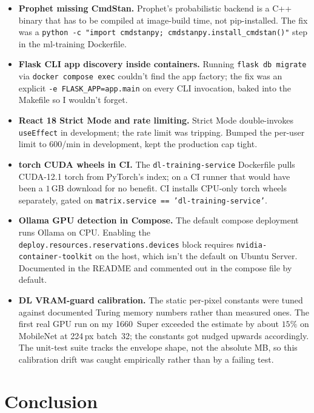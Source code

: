 \documentclass[12pt, a4paper]{report}
\begin{document}
\begin{itemize}
    \item \textbf{Prophet missing CmdStan.} Prophet's probabilistic
        backend is a C++ binary that has to be compiled at
        image-build time, not pip-installed. The fix was a
        \texttt{python -c "import\,cmdstanpy;\,cmdstanpy.install\_cmdstan()"}
        step in the ml-training Dockerfile.
    \item \textbf{Flask CLI app discovery inside containers.}
        Running \texttt{flask db migrate} via \texttt{docker
        compose exec} couldn't find the app factory; the fix
        was an explicit \texttt{-e FLASK\_APP=app.main} on every
        CLI invocation, baked into the Makefile so I wouldn't
        forget.
    \item \textbf{React 18 Strict Mode and rate limiting.} Strict
        Mode double-invokes \texttt{useEffect} in development;
        the rate limit was tripping. Bumped the per-user limit
        to $600$/min in development, kept the production cap
        tight.
    \item \textbf{torch CUDA wheels in CI.} The
        \texttt{dl-training-service} Dockerfile pulls CUDA-12.1
        torch from PyTorch's index; on a CI runner that would
        have been a $1$\,GB download for no benefit. CI installs
        CPU-only torch wheels separately, gated on
        \texttt{matrix.service == 'dl-training-service'}.
    \item \textbf{Ollama GPU detection in Compose.} The default
        compose deployment runs Ollama on CPU. Enabling the
        \texttt{deploy.resources.reservations.devices} block
        requires \texttt{nvidia-container-toolkit} on the host,
        which isn't the default on Ubuntu Server. Documented in
        the README and commented out in the compose file by
        default.
    \item \textbf{DL VRAM-guard calibration.} The static
        per-pixel constants were tuned against documented Turing
        memory numbers rather than measured ones. The first real
        GPU run on my 1660~Super exceeded the estimate by about
        $15\%$ on MobileNet at 224\,px batch~32; the constants
        got nudged upwards accordingly. The unit-test suite
        tracks the envelope shape, not the absolute MB, so this
        calibration drift was caught empirically rather than by
        a failing test.
\end{itemize}

\section*{Conclusion}
\end{document}
